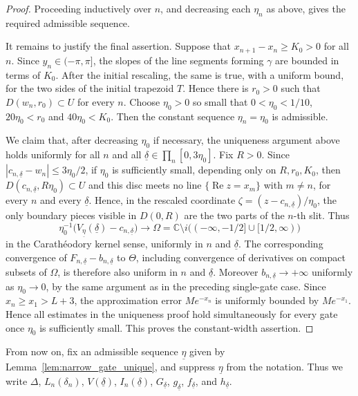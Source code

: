 \documentclass[a4paper, 11pt, reqno]{amsart}
\numberwithin{equation}{section}
\theoremstyle{plain}
\theoremstyle{remark}
\newcommand{\C}{{\mathbb{C}}}
\newcommand{\uldelta}{\underline{\delta}}
\newcommand{\uleta}{\underline{\eta}}
\newcommand{\Rea}{\operatorname{Re }}
\begin{document}
\begin{proof}
	Proceeding inductively over \(n\), and decreasing each \(\eta_n\) as above,
	gives the required admissible sequence.
	
	It remains to justify the final assertion. Suppose that \(x_{n+1}-x_n\ge K_0>0\) for all \(n\). Since \(y_n\in(-\pi,\pi]\), the slopes of the line segments forming \(\gamma\) are bounded in terms of \(K_0\). After the initial rescaling, the same is true, with a uniform bound, for the two sides of the initial trapezoid \(T\). Hence there is \(r_0>0\) such that \(D(w_n,r_0)\subset U\) for every \(n\). Choose \(\eta_0>0\) so small that $0<\eta_0<1/10$, \(20\eta_0<r_0\) and \(40\eta_0<K_0\). Then the constant sequence \(\eta_n=\eta_0\) is admissible.
	
	We claim that, after decreasing \(\eta_0\) if necessary, the uniqueness
	argument above holds uniformly for all \(n\) and all
	\(\uldelta\in\prod_n[0,3\eta_0]\). Fix \(R>0\). Since
	\(|c_{n,\uldelta}-w_n|\le3\eta_0/2\), if \(\eta_0\) is sufficiently small,
	depending only on \(R,r_0,K_0\), then
	\(D(c_{n,\uldelta},R\eta_0)\subset U\) and this disc meets no line
	\(\{\Rea z=x_m\}\) with \(m\ne n\), for every \(n\) and every
	\(\uldelta\). Hence, in the rescaled coordinate
	\(\zeta=(z-c_{n,\uldelta})/\eta_0\), the only boundary pieces visible in
	\(D(0,R)\) are the two parts of the \(n\)-th slit. Thus
	\[
	\eta_0^{-1}\bigl(V_{\uleta}(\uldelta)-c_{n,\uldelta}\bigr)
	\longrightarrow
	\Omega=\C\setminus i\bigl((-\infty,-1/2]\cup[1/2,\infty)\bigr)
	\]
	in the Carath\'eodory kernel sense, uniformly in \(n\) and
	\(\uldelta\). The corresponding convergence of
	\(F_{n,\uldelta}-b_{n,\uldelta}\) to \(\Theta\), including convergence of
	derivatives on compact subsets of \(\Omega\), is therefore also uniform in
	\(n\) and \(\uldelta\). Moreover \(b_{n,\uldelta}\to+\infty\) uniformly as
	\(\eta_0\to0\), by the same argument as in the preceding single-gate case. Since \(x_n\ge x_1>L+3\), the approximation error
	\(Me^{-x_n}\) is uniformly bounded by \(Me^{-x_1}\). Hence all estimates in
	the uniqueness proof hold simultaneously for every gate once \(\eta_0\) is
	sufficiently small. This proves the constant-width assertion.
\end{proof}

From now on, fix an admissible sequence \(\uleta\) given by Lemma~\ref{lem:narrow_gate_unique}, and suppress \(\uleta\) from the notation. Thus we write \(\Delta\), \(L_n(\delta_n)\), \(V(\uldelta)\), \(I_n(\uldelta)\), \(G_{\uldelta}\), \(g_{\uldelta}\), \(f_{\uldelta}\), and \(h_{\uldelta}\).
\end{document}
